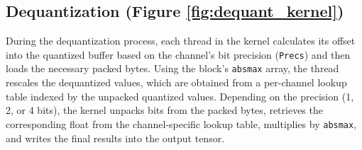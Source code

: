 \subsection{Dequantization (Figure \ref{fig:dequant_kernel})}
During the dequantization process, each thread in the kernel calculates its offset into the quantized buffer based on the channel’s bit precision (\texttt{Precs}) and then loads the necessary packed bytes. Using the block’s \texttt{absmax} array, the thread rescales the dequantized values, which are obtained from a per-channel lookup table indexed by the unpacked quantized values. Depending on the precision (1, 2, or 4 bits), the kernel unpacks bits from the packed bytes, retrieves the corresponding float from the channel-specific lookup table, multiplies by \texttt{absmax}, and writes the final results into the output tensor.



